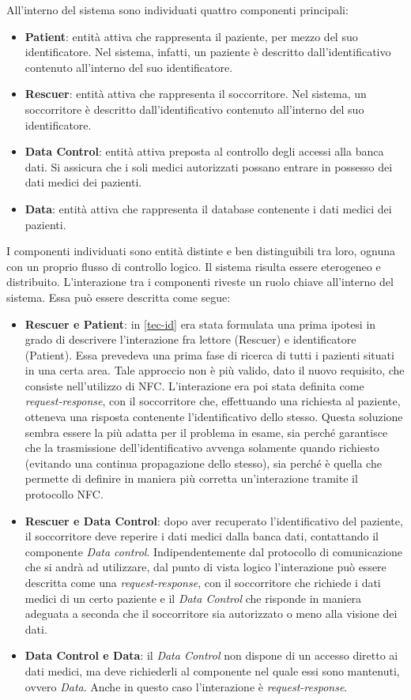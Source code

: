 \documentclass[a4paper,12pt]{report}
\begin{document}
All'interno del sistema sono individuati quattro componenti principali:
\begin{itemize}
	\item \textbf{Patient}: entità attiva che rappresenta il paziente, per mezzo del suo identificatore. Nel sistema, infatti, un paziente è descritto dall'identificativo contenuto all'interno del suo identificatore.  
	\item \textbf{Rescuer}: entità attiva che rappresenta il soccorritore. Nel sistema, un soccorritore è descritto dall'identificativo contenuto all'interno del suo identificatore.
	\item \textbf{Data Control}: entità attiva preposta al controllo degli accessi alla banca dati. Si assicura che i soli medici autorizzati possano entrare in possesso dei dati medici dei pazienti.  
	\item \textbf{Data}: entità attiva che rappresenta il database contenente i dati medici dei pazienti.
\end{itemize}
I componenti individuati sono entità distinte e ben distinguibili tra loro, ognuna con un proprio flusso di controllo logico. Il sistema risulta essere eterogeneo e distribuito. L'interazione tra i componenti riveste un ruolo chiave all'interno del sistema. Essa può essere descritta come segue:
\begin{itemize}
	\item \textbf{Rescuer e Patient}: in \autoref{tec-id} era stata formulata una prima ipotesi in grado di descrivere l'interazione fra lettore (Rescuer) e identificatore (Patient). Essa prevedeva una prima fase di ricerca di tutti i pazienti situati in una certa area. Tale approccio non è più valido, dato il nuovo requisito, che consiste nell'utilizzo di NFC. L'interazione era poi stata definita come \emph{request-response}, con il soccorritore che, effettuando una richiesta al paziente, otteneva una risposta contenente l'identificativo dello stesso. Questa soluzione sembra essere la più adatta per il problema in esame, sia perché garantisce che la trasmissione dell'identificativo avvenga solamente quando richiesto (evitando una continua propagazione dello stesso), sia perché è quella che permette di definire in maniera più corretta un'interazione tramite il protocollo NFC.
	\item \textbf{Rescuer e Data Control}: dopo aver recuperato l'identificativo del paziente, il soccorritore deve reperire i dati medici dalla banca dati, contattando il componente \emph{Data control}. Indipendentemente dal protocollo di comunicazione che si andrà ad utilizzare, dal punto di vista logico l'interazione può essere descritta come una \emph{request-response}, con il soccorritore che richiede i dati medici di un certo paziente e il \emph{Data Control} che risponde in maniera adeguata a seconda che il soccorritore sia autorizzato o meno alla visione dei dati.
	\item \textbf{Data Control e Data}: il \emph{Data Control} non dispone di un accesso diretto ai dati medici, ma deve richiederli al componente nel quale essi sono mantenuti, ovvero \emph{Data}. Anche in questo caso l'interazione è \emph{request-response}.
\end{itemize}
\end{document}
